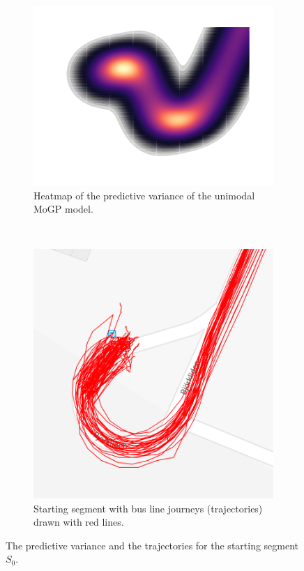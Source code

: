 \begin{figure}[h!]
    \centering
    \begin{subfigure}[t]{0.6\textwidth}
        \centering
        \includegraphics[width=\textwidth]{figures/0_1000x1000}
        \caption[Heatmap of the predictive variance of the unimodal MoGP model]
        {\small Heatmap of the predictive variance of the unimodal MoGP model.}
        \label{fig:predictive-var-combined-gp1}
    \end{subfigure}
    ~
    \begin{subfigure}[t]{0.5\textwidth}
        \centering
        \includegraphics[width=\textwidth]{figures/starting_segment}
        \caption[]
        {\small Starting segment with bus line journeys (trajectories) drawn with red lines.}
        \label{fig:starting-segment-trajectory}
    \end{subfigure}
    \caption[The predictive variance and the trajectories for the starting segment $S_0$]
    {\small The predictive variance and the trajectories for the starting segment $S_0$.}
\end{figure}

